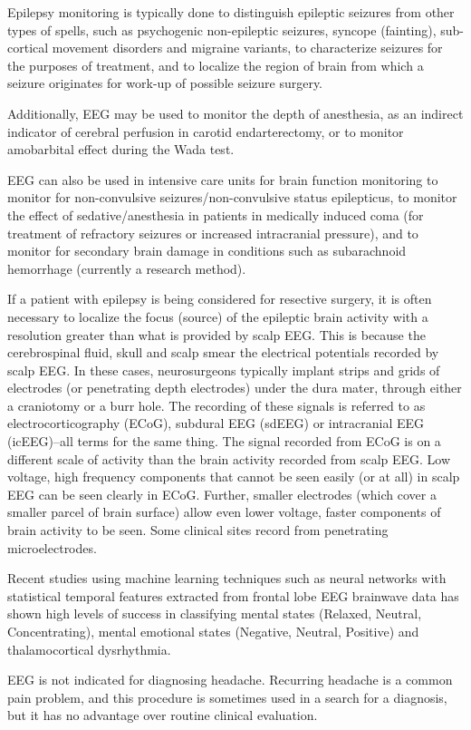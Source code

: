 Epilepsy monitoring is typically done to distinguish epileptic seizures from other types of spells, such as psychogenic non-epileptic seizures, syncope (fainting), sub-cortical movement disorders and migraine variants, to characterize seizures for the purposes of treatment, and to localize the region of brain from which a seizure originates for work-up of possible seizure surgery.

Additionally, EEG may be used to monitor the depth of anesthesia, as an indirect indicator of cerebral perfusion in carotid endarterectomy, or to monitor amobarbital effect during the Wada test.

EEG can also be used in intensive care units for brain function monitoring to monitor for non-convulsive seizures/non-convulsive status epilepticus, to monitor the effect of sedative/anesthesia in patients in medically induced coma (for treatment of refractory seizures or increased intracranial pressure), and to monitor for secondary brain damage in conditions such as subarachnoid hemorrhage (currently a research method).

If a patient with epilepsy is being considered for resective surgery, it is often necessary to localize the focus (source) of the epileptic brain activity with a resolution greater than what is provided by scalp EEG. This is because the cerebrospinal fluid, skull and scalp smear the electrical potentials recorded by scalp EEG. In these cases, neurosurgeons typically implant strips and grids of electrodes (or penetrating depth electrodes) under the dura mater, through either a craniotomy or a burr hole. The recording of these signals is referred to as electrocorticography (ECoG), subdural EEG (sdEEG) or intracranial EEG (icEEG)--all terms for the same thing. The signal recorded from ECoG is on a different scale of activity than the brain activity recorded from scalp EEG. Low voltage, high frequency components that cannot be seen easily (or at all) in scalp EEG can be seen clearly in ECoG. Further, smaller electrodes (which cover a smaller parcel of brain surface) allow even lower voltage, faster components of brain activity to be seen. Some clinical sites record from penetrating microelectrodes.

Recent studies using machine learning techniques such as neural networks with statistical temporal features extracted from frontal lobe EEG brainwave data has shown high levels of success in classifying mental states (Relaxed, Neutral, Concentrating), mental emotional states (Negative, Neutral, Positive) and thalamocortical dysrhythmia.

EEG is not indicated for diagnosing headache. Recurring headache is a common pain problem, and this procedure is sometimes used in a search for a diagnosis, but it has no advantage over routine clinical evaluation.